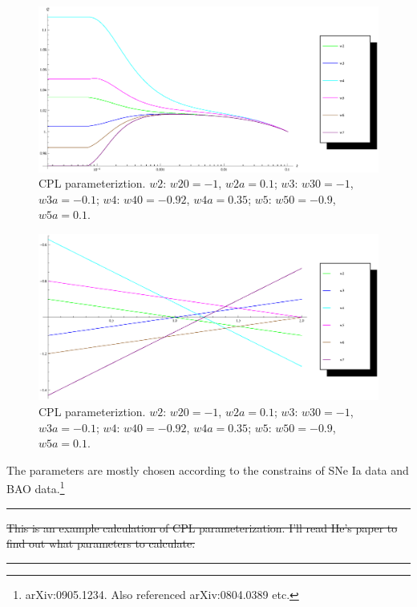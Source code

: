 \documentclass{article}
\begin{document}
{\begin{figure}[!htbp]
\centering
\includegraphics[width=400pt]{CPL_Sync_2012-02-20_QFactor.eps}
\caption{CPL parameteriztion. $w2$: $w20=-1$, $w2a=0.1$; $w3$: $w30=-1$, $w3a=-0.1$; $w4$: $w40=-0.92$, $w4a=0.35$; $w5$: $w50=-0.9$, $w5a=0.1$.}\label{fig:QFactor_CPL_SynchronousGauge_2012-02-19}
\end{figure}

\begin{figure}[!htbp]
\centering
\includegraphics[width=400pt]{CPL_Sync_2012-02-20_EoS.eps}
\caption{CPL parameteriztion. $w2$: $w20=-1$, $w2a=0.1$; $w3$: $w30=-1$, $w3a=-0.1$; $w4$: $w40=-0.92$, $w4a=0.35$; $w5$: $w50=-0.9$, $w5a=0.1$.}\label{fig:EoS_CPL_Sync_2012-02-19}
\end{figure}



The parameters are mostly chosen according to the constrains of SNe Ia data and BAO data.{\footnote{arXiv:0905.1234. Also referenced arXiv:0804.0389 etc.}}


\vspace{2ex}
\hrule
\vspace{2ex}

\sout{
This is an example calculation of CPL parameterization. I'll read He's paper to find out what parameters to calculate.
}

\vspace{2ex}
\hrule
\vspace{2ex}


}
\end{document}
